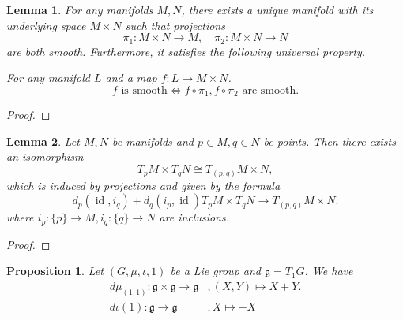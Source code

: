 \documentclass{article}
\newtheorem{proposition}{Proposition}[section]
\newtheorem{lemma}{Lemma}[section]
\numberwithin{equation}{section}
\DeclareMathOperator{\id}{id}
\begin{document}
\begin{lemma}
For any manifolds $M,N$, there exists a unique manifold with its underlying space $M\times N$ such that projections
\begin{equation*}
\pi_1:M\times N\to M,\quad \pi_2:M\times N\to N
\end{equation*}
are both smooth. Furthermore, it satisfies the following universal property.\\
\par For any manifold $L$ and a map $f:L\to M\times N$. 
\begin{equation*}
f \text{ is smooth}\Leftrightarrow f\circ\pi_1,f\circ\pi_2\text{ are smooth}.
\end{equation*}
\label{universal_property_Lie_group_product}
\end{lemma}

\begin{proof}
\end{proof}

\begin{lemma}
Let $M,N$ be manifolds and $p\in M,q\in N$ be points. Then there exists an isomorphism 
\begin{equation*}
T_pM\times T_qN\cong T_{(p,q)}M\times N,
\end{equation*}
which is induced by projections and given by the formula
\begin{equation*}
d_p(\id,i_q)+d_q(i_p,\id)T_pM\times T_qN\to T_{(p,q)}M\times N.
\end{equation*}
where $i_p:\{p\}\to M,i_q:\{q\}\to N$ are inclusions.
\label{isomorphism_product_tangent_space}
\end{lemma}

\begin{proof}
\end{proof}

\begin{proposition}
Let $(G,\mu,\iota,1)$ be a Lie group and $\mathfrak{g}=T_1G$. We have
\begin{align*}
d\mu_{(1,1)}:\mathfrak{g}\times\mathfrak{g}\to\mathfrak{g}&, (X,Y)\mapsto X+Y.\\
d\iota(1):\mathfrak{g}\to\mathfrak{g}&, X\mapsto -X
\end{align*}
\end{proposition}
\end{document}
